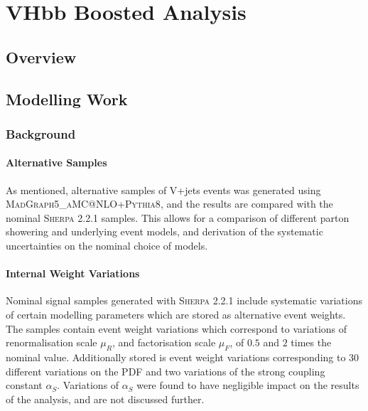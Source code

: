 \chapter{VHbb Boosted Analysis}
\label{chap:vhbb_boosted}

\section{Overview}

\section{Modelling Work}

\subsection{Background}
%

%
\subsubsection{Alternative Samples}
As mentioned, alternative samples of V+jets events was generated using \textsc{MadGraph5\_aMC@NLO+Pythia8}, and the results are compared with the nominal \textsc{Sherpa 2.2.1} samples. This allows for a comparison of different parton showering and underlying event models, and derivation of the systematic uncertainties on the nominal choice of models.

\subsubsection{Internal Weight Variations}
Nominal signal samples generated with \textsc{Sherpa 2.2.1} include systematic variations of certain modelling parameters which are stored as alternative event weights. The samples contain event weight variations which correspond to variations of renormalisation scale $\mu_R$, and factorisation scale $\mu_F$, of $0.5$ and $2$ times the nominal value. Additionally stored is event weight variations corresponding to $30$ different variations on the PDF and two variations of the strong coupling constant $\alpha_S$. Variations of $\alpha_S$ were found to have negligible impact on the results of the analysis, and are not discussed further. 

